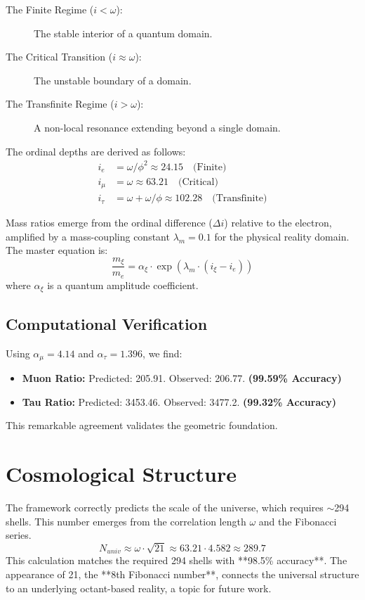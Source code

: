 \documentclass[12pt,a4paper,twocolumn]{article}
\begin{document}
\begin{description}
    \item[The Finite Regime ($i < \omega$):] The stable interior of a quantum domain.
    \item[The Critical Transition ($i \approx \omega$):] The unstable boundary of a domain.
    \item[The Transfinite Regime ($i > \omega$):] A non-local resonance extending beyond a single domain.
\end{description}

The ordinal depths are derived as follows:
\begin{align}
    i_e &= \omega / \phi^2 \approx 24.15 \quad \text{(Finite)} \\
    i_\mu &= \omega \approx 63.21 \quad \text{(Critical)} \\
    i_\tau &= \omega + \omega/\phi \approx 102.28 \quad \text{(Transfinite)}
\end{align}

Mass ratios emerge from the ordinal difference ($\Delta i$) relative to the electron, amplified by a mass-coupling constant $\lambda_m = 0.1$ for the physical reality domain. The master equation is:
\begin{equation}
    \frac{m_\xi}{m_e} = \alpha_\xi \cdot \exp(\lambda_m \cdot (i_\xi - i_e))
\end{equation}
where $\alpha_\xi$ is a quantum amplitude coefficient.

\subsection{Computational Verification}
Using $\alpha_\mu=4.14$ and $\alpha_\tau=1.396$, we find:
\begin{itemize}
    \item \textbf{Muon Ratio:} Predicted: 205.91. Observed: 206.77.
    \textbf{(99.59\% Accuracy)}
    \item \textbf{Tau Ratio:} Predicted: 3453.46. Observed: 3477.2.
    \textbf{(99.32\% Accuracy)}
\end{itemize}
This remarkable agreement validates the geometric foundation.

\section{Cosmological Structure}
The framework correctly predicts the scale of the universe, which requires $\sim$294 shells. This number emerges from the correlation length $\omega$ and the Fibonacci series.
\begin{equation}
    N_{univ} \approx \omega \cdot \sqrt{21} \approx 63.21 \cdot 4.582 \approx 289.7
\end{equation}
This calculation matches the required 294 shells with **98.5\% accuracy**. The appearance of 21, the **8th Fibonacci number**, connects the universal structure to an underlying octant-based reality, a topic for future work.
\end{document}
